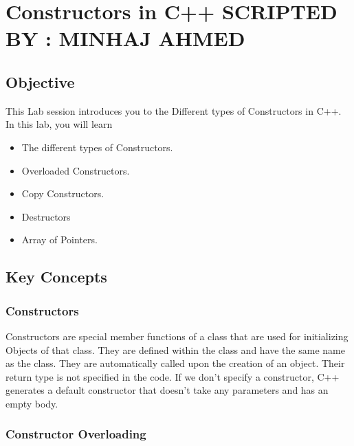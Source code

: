 \documentclass[11pt,fleqn]{book} %
\begin{document}
\newpage
\chapter{Constructors in C++ \hspace{36mm} {\textsc{\small SCRIPTED BY : MINHAJ AHMED}}}

\section{Objective}

This Lab session introduces you to the Different types of Constructors in C++. In this lab, you will learn

\begin{itemize}
\item The different types of Constructors.
\item Overloaded Constructors.
\item Copy Constructors.
\item Destructors
\item Array of Pointers.
\end{itemize}


\section{Key Concepts}

\subsection{Constructors}

Constructors are special member functions of a class that are used for initializing Objects of that class. They are defined within the class and have the same name as the class. They are automatically called upon the creation of an object. Their return type is not specified in the code. If we don't specify a constructor, C++ generates a default constructor that doesn't take any parameters and has an empty body.

\subsection{Constructor Overloading}
\end{document}
